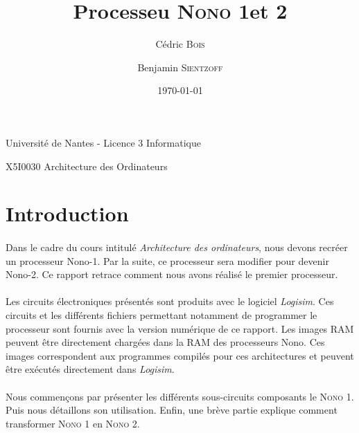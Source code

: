 \documentclass[a4paper]{article}
\title{Processeu \textsc{Nono} 1et 2}
\author{Cédric \textsc{Bois} \and Benjamin \textsc{Sientzoff}}
\date{\today}
\begin{document}
	\maketitle
	\vspace{15cm}
	\par{Université de Nantes - Licence 3 Informatique}
	\par{\textsc{X5I0030} Architecture des Ordinateurs}
	\newpage
	\tableofcontents
	\newpage %
	
	\section*{Introduction}

		\paragraph{}{
		Dans le cadre du cours intitulé \textit{Architecture des ordinateurs}, nous devons recréer
		un processeur Nono-1. Par la suite, ce processeur sera modifier pour devenir Nono-2. Ce 
		rapport retrace comment nous avons réalisé le premier processeur.
		}
		
		\paragraph{}{
		Les circuits électroniques présentés sont produits avec le logiciel \textit{Logisim}. Ces
		circuits et les différents fichiers permettant notamment de programmer le processeur sont 
		fournis avec la version numérique de ce rapport. Les images RAM peuvent être directement 
		chargées dans la RAM des processeurs Nono. Ces images correspondent aux programmes 
		compilés pour ces architectures et peuvent être exécutés directement dans \textit{Logisim}.
		}
		
		\paragraph{}{
		Nous commençons par présenter les différents sous-circuits composants le \textsc{Nono 1}.
		Puis nous détaillons son utilisation. Enfin, une brève partie explique comment 
		transformer \textsc{Nono 1} en \textsc{Nono 2}.
		}
	
	\newpage
	
\end{document}
